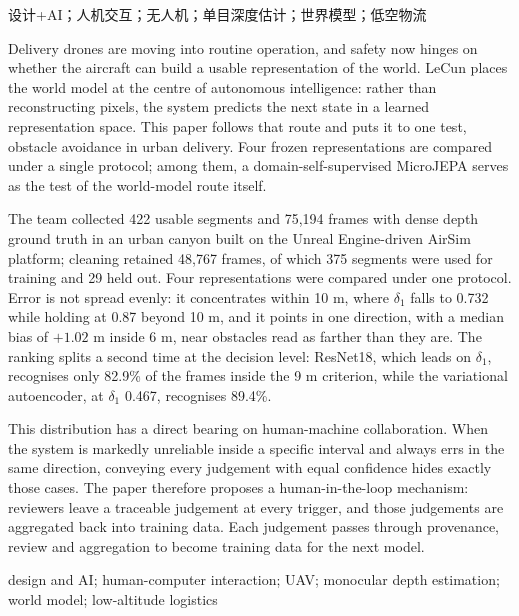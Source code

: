 \documentclass[12pt,a4paper]{ctexart}
\begin{document}
\vspace{0.3cm}

设计+AI；人机交互；无人机；单目深度估计；世界模型；低空物流

\vspace{0.8cm}

 Delivery drones are moving into routine operation, and safety now hinges on whether the aircraft can build a usable representation of the world. LeCun places the world model at the centre of autonomous intelligence: rather than reconstructing pixels, the system predicts the next state in a learned representation space. This paper follows that route and puts it to one test, obstacle avoidance in urban delivery. Four frozen representations are compared under a single protocol; among them, a domain-self-supervised MicroJEPA serves as the test of the world-model route itself.

The team collected 422 usable segments and 75,194 frames with dense depth ground truth in an urban canyon built on the Unreal Engine-driven AirSim platform; cleaning retained 48,767 frames, of which 375 segments were used for training and 29 held out. Four representations were compared under one protocol. Error is not spread evenly: it concentrates within 10 m, where $\delta_1$ falls to 0.732 while holding at 0.87 beyond 10 m, and it points in one direction, with a median bias of $+1.02$ m inside 6 m, near obstacles read as farther than they are. The ranking splits a second time at the decision level: ResNet18, which leads on $\delta_1$, recognises only 82.9\% of the frames inside the 9 m criterion, while the variational autoencoder, at $\delta_1$ 0.467, recognises 89.4\%.

This distribution has a direct bearing on human-machine collaboration. When the system is markedly unreliable inside a specific interval and always errs in the same direction, conveying every judgement with equal confidence hides exactly those cases. The paper therefore proposes a human-in-the-loop mechanism: reviewers leave a traceable judgement at every trigger, and those judgements are aggregated back into training data. Each judgement passes through provenance, review and aggregation to become training data for the next model.

\vspace{0.3cm}

 design and AI; human-computer interaction; UAV; monocular depth estimation; world model; low-altitude logistics
\end{document}
